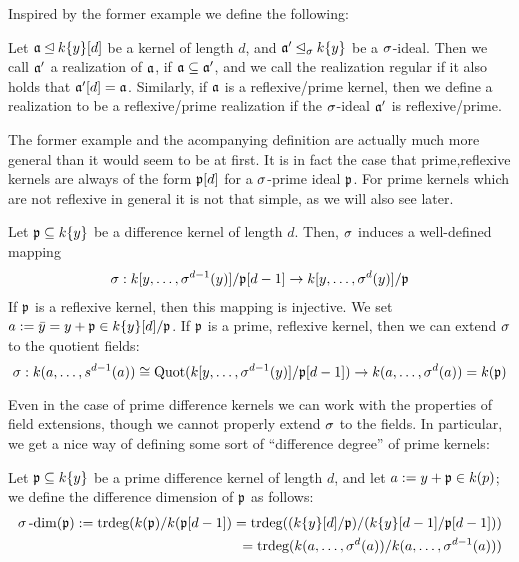 Inspired by the former example we define the following:
\begin{defn}
Let $\mathfrak{a} \unlhd k\{y\}[d]$ be a kernel of length $d$, and $\mathfrak{a}' \unlhd_{\sigma} k\{y\}$ be a $\sigma$-ideal. Then we call $\mathfrak{a}'$ a realization of $\mathfrak{a}$, if $\mathfrak{a} \subseteq \mathfrak{a}'$, 
and we call the realization regular if it also holds that $\mathfrak{a}'[d] = \mathfrak{a}$. Similarly, if $\mathfrak{a}$ is a reflexive/prime kernel, then we define a realization to be a reflexive/prime realization if the $\sigma$-ideal $\mathfrak{a}'$ is reflexive/prime.
\end{defn}

The former example and the acompanying definition are actually much more general than it would seem to be at first. 
It is in fact the case that prime,reflexive kernels are always of the form $\mathfrak{p}[d]$ for a $\sigma$-prime ideal $\mathfrak{p}$.
For prime kernels which are not reflexive in general it is not that simple, as we will also see later. 

\begin{rem}\label{sigmawelldeffker}
Let $\mathfrak{p} \subseteq k\{y\}$ be a difference kernel of length $d$. Then, $\sigma$ induces a well-defined mapping 
\begin{align*}
\sigma: k[y,\ldots,\sigma^{d-1}(y)]/\mathfrak{p}[d-1] \rightarrow k[y,\ldots,\sigma^{d}(y)]/\mathfrak{p}
\end{align*}
If $\mathfrak{p}$ is a reflexive kernel, then this mapping is injective. 
We set $a := \bar y = y + \mathfrak{p} \in k\{y\}[d]/\mathfrak{p}$. If $\mathfrak{p}$ is a prime, reflexive kernel, then we can extend $\sigma$ to the quotient fields:
\[ \sigma: k(a,\ldots,s^{d-1}(a)) \cong \text{Quot}(k[y,\ldots,\sigma^{d-1}(y)]/\mathfrak{p}[d-1]) \rightarrow k(a,\ldots,\sigma^d(a)) = k(\mathfrak{p}) \]
\end{rem}

Even in the case of prime difference kernels we can work with the properties of field extensions, though we cannot properly extend $\sigma$ to the fields.
 In particular, we get a nice way of defining some sort of ``difference degree'' of prime kernels:
\begin{defn}
Let $\mathfrak{p} \subseteq k\{y\}$ be a prime difference kernel of length $d$, and let $a:= y + \mathfrak{p} \in k(p)$; we define the difference dimension of $\mathfrak{p}$ as follows:
\begin{align*} \sigma\operatorname{-dim}(\mathfrak{p}) := \text{trdeg}(k(\mathfrak{p})/k(\mathfrak{p}[d-1]) = \text{trdeg}((k\{y\}[d]/\mathfrak{p})/(k\{y\}[d-1]/\mathfrak{p}[d-1])) \\  = \text{trdeg}(k(a,\ldots,\sigma^{d}(a))/k(a,\ldots,\sigma^{d-1}(a))) \end{align*}
\end{defn}

